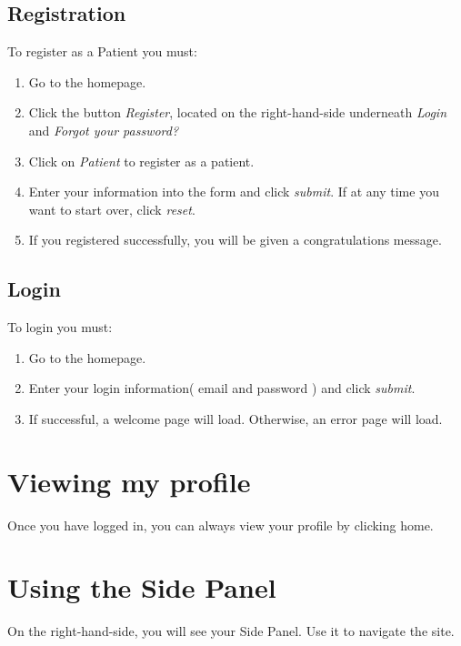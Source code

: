 \subsection{Registration}
To register as a Patient you must:
\begin{enumerate}
\item Go to the homepage.
\item Click the button \textit{Register}, located on the right-hand-side underneath \textit{Login} and \textit{Forgot your password?}
\item Click on \textit{Patient} to register as a patient.
\item Enter your information into the form and click \textit{submit}. If at any time you want to start over, click \textit{reset}.
\item If you registered successfully, you will be given a congratulations message.
\end{enumerate}

\subsection{Login}
To login you must:
\begin{enumerate}
\item Go to the homepage.
\item Enter your login information( email and password ) and click \textit{submit}.
\item If successful, a welcome page will load. Otherwise, an error page will load. 
\end{enumerate}
\section{Viewing my profile}
Once you have logged in, you can always view your profile by clicking home.

\section{Using the Side Panel}
On the right-hand-side, you will see your Side Panel. Use it to navigate the site.

